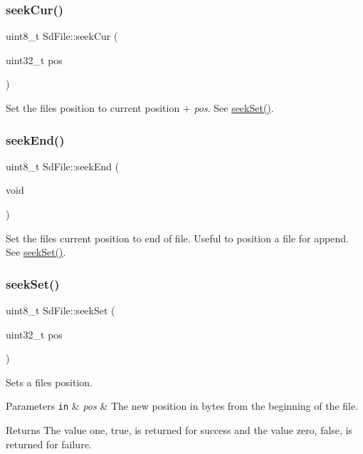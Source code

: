 \subsubsection{\texorpdfstring{seek\+Cur()}{seekCur()}}
{\footnotesize\ttfamily uint8\+\_\+t Sd\+File\+::seek\+Cur (\begin{DoxyParamCaption}\item[{uint32\+\_\+t}]{pos }\end{DoxyParamCaption})\hspace{0.3cm}{\ttfamily [inline]}}

Set the files position to current position + {\itshape pos}. See \hyperlink{class_sd_file_a5b8ea0ba6a9fec1ee8f1b11e90edb0c6}{seek\+Set()}. \mbox{\label{class_sd_file_afa70bc7ba5eb789aee1b62fc5fafaa5b}} 
\subsubsection{\texorpdfstring{seek\+End()}{seekEnd()}}
{\footnotesize\ttfamily uint8\+\_\+t Sd\+File\+::seek\+End (\begin{DoxyParamCaption}\item[{void}]{ }\end{DoxyParamCaption})\hspace{0.3cm}{\ttfamily [inline]}}

Set the files current position to end of file. Useful to position a file for append. See \hyperlink{class_sd_file_a5b8ea0ba6a9fec1ee8f1b11e90edb0c6}{seek\+Set()}. \mbox{\label{class_sd_file_a5b8ea0ba6a9fec1ee8f1b11e90edb0c6}} 
\subsubsection{\texorpdfstring{seek\+Set()}{seekSet()}}
{\footnotesize\ttfamily uint8\+\_\+t Sd\+File\+::seek\+Set (\begin{DoxyParamCaption}\item[{uint32\+\_\+t}]{pos }\end{DoxyParamCaption})}

Sets a file\textquotesingle{}s position.


\begin{DoxyParams}[1]{Parameters}
\mbox{\tt in}  & {\em pos} & The new position in bytes from the beginning of the file.\\
\hline
\end{DoxyParams}
\begin{DoxyReturn}{Returns}
The value one, true, is returned for success and the value zero, false, is returned for failure. 
\end{DoxyReturn}
\mbox{\label{class_sd_file_a08c9e76a4a7bb43fccf1dd5c72c66a16}} 
